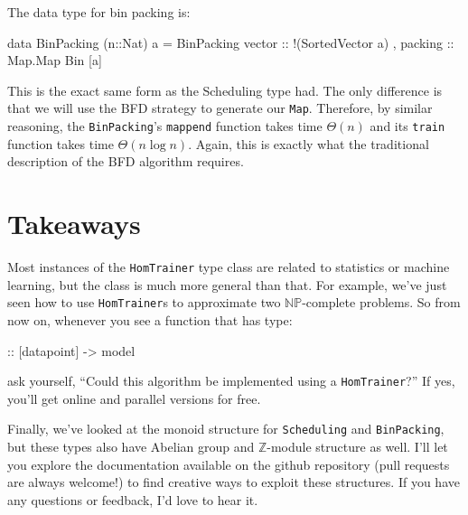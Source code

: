 \documentclass[tikz]{tmr}
\newcommand\h{\lstinline}
\newcommand{\np}{{\ensuremath{\mathbb{NP}}}}
\newcommand\+{\mdoubleplus}
\begin{document}
\begin{figure}[H]
\begin{tikzpicture}
\end{tikzpicture}
\vspace{0.05in}
\end{figure}

The data type for bin packing is:
\begin{spec}
data BinPacking (n::Nat) a = BinPacking
    { vector  :: !(SortedVector a)
    , packing :: Map.Map Bin [a]
    }
\end{spec}
This is the exact same form as the Scheduling type had.
The only difference is that we will use the BFD strategy to generate our \h{Map}.
Therefore, by similar reasoning, the \h{BinPacking}'s \h{mappend} function takes time $\Theta(n)$ and its \h{train} function takes time $\Theta(n\log n)$.
Again, this is exactly what the traditional description of the BFD algorithm requires.

\section{Takeaways}

Most instances of the \h{HomTrainer} type class are related to statistics or machine learning, but the class is much more general than that.
For example, we've just seen how to use \h{HomTrainer}s to approximate two \np-complete problems.
So from now on, whenever you see a function that has type:
\begin{spec}
 :: [datapoint] -> model
\end{spec}
ask yourself, ``Could this algorithm be implemented using a \h{HomTrainer}?''
If yes, you'll get online and parallel versions for free.

Finally, we've looked at the monoid structure for \h{Scheduling} and \h{BinPacking}, but these types also have Abelian group and $\mathbb{Z}$-module structure as well.
I'll let you explore the documentation available on the github repository \cite{hlearn} 
(pull requests are always welcome!)
to find creative ways to exploit these structures.
If you have any questions or feedback, I'd love to hear it.

% 

\end{document}
